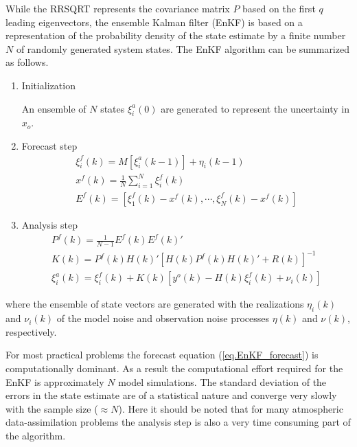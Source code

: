 While the RRSQRT represents the covariance matrix $P$ based on the first $q$
leading eigenvectors, the ensemble Kalman filter (EnKF) is based on a
representation of the probability density of the state estimate by a finite
number $N$ of randomly generated system states. The EnKF algorithm can be
summarized as follows.

\begin{enumerate}
\item Initialization

An ensemble of $N$ states $\xi^a_i(0)$ are generated to represent the
uncertainty in $x_o$.

\item Forecast step
  \begin{eqnarray}
    \xi_i^f(k)=M[\xi_i^a(k-1)] + \eta_i(k-1) \label{eq.EnKF_forecast} \\
    x^f(k)=\frac{1}{N} \sum_{i=1}^N \xi_i^f(k) \\
    E^f(k)=[\xi_1^f(k)-x^f(k),\cdots,\xi_N^f(k)-x^f(k)]
  \end{eqnarray}

\item Analysis step
  \begin{eqnarray}
    P^f(k)=\frac{1}{N-1}E^f(k)E^f(k)' \\
    K(k) = P^f(k)H(k)'[H(k)P^f(k)H(k)'+R(k)]^{-1} \\
    \xi^a_i(k) = \xi^f_i(k) + K(k) [y^o(k) - H(k) \xi^f_i(k) + \nu_i(k)]
  \end{eqnarray}
\end{enumerate}
where the ensemble of state vectors are generated with the realizations
$\eta_i(k)$ and $\nu_i(k)$ of the model noise and observation noise processes
$\eta(k)$ and $\nu(k)$, respectively.

For most practical problems the forecast equation (\ref{eq.EnKF_forecast}) is
computationally dominant. As a result the computational effort required for the
EnKF is approximately $N$ model simulations. The standard deviation of the
errors in the state estimate are of a statistical nature and converge very
slowly with the sample size ($\approx N$). Here it should be noted that for
many atmospheric data-assimilation problems the analysis step is also a very
time consuming part of the algorithm.



